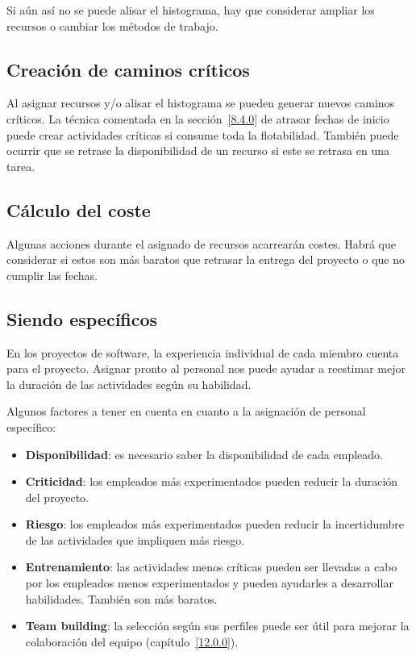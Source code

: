 \documentclass[12pt]{article}
\begin{document}
{Si aún así no se puede alisar el histograma, hay que considerar ampliar los recursos o cambiar los métodos de trabajo.}

\subsection{Creación de caminos críticos}
\label{8.5.0}

{Al asignar recursos y/o alisar el histograma se pueden generar nuevos caminos críticos. La técnica comentada en la sección~\ref{8.4.0} de atrasar fechas de inicio puede crear actividades críticas si consume toda la flotabilidad. También puede ocurrir que se retrase la disponibilidad de un recurso si este se retrasa en una tarea.}

\subsection{Cálculo del coste}
\label{8.6.0}

{Algunas acciones durante el asignado de recursos acarrearán costes. Habrá que considerar si estos son más baratos que retrasar la entrega del proyecto o que no cumplir las fechas.}

\subsection{Siendo específicos}
\label{8.7.0}

{En los proyectos de software, la experiencia individual de cada miembro cuenta para el proyecto. Asignar pronto al personal nos puede ayudar a reestimar mejor la duración de las actividades según su habilidad.}

\newpage
{Algunos factores a tener en cuenta en cuanto a la asignación de personal específico:}

\begin{itemize}
    \item {\textbf{Disponibilidad}: es necesario saber la disponibilidad de cada empleado.}
    \item {\textbf{Criticidad}: los empleados más experimentados pueden reducir la duración del proyecto.}
    \item {\textbf{Riesgo}: los empleados más experimentados pueden reducir la incertidumbre de las actividades que impliquen más riesgo.}
    \item {\textbf{Entrenamiento}: las actividades menos críticas pueden ser llevadas a cabo por los empleados menos experimentados y pueden ayudarles a desarrollar habilidades. También son más baratos.}
    \item {\textbf{Team building}: la selección según sus perfiles puede ser útil para mejorar la colaboración del equipo (capítulo~\ref{12.0.0}).}
\end{itemize}
\end{document}
